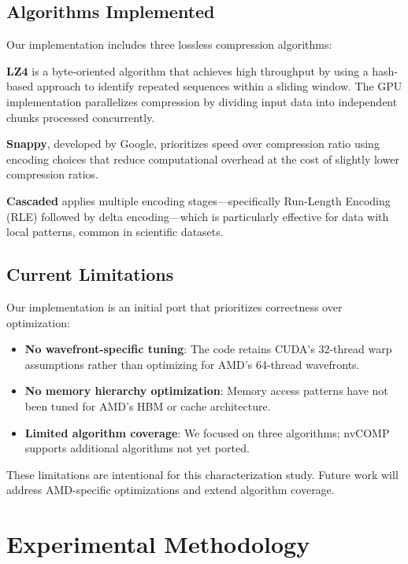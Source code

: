 \documentclass[runningheads]{llncs}
\begin{document}
\subsection{Algorithms Implemented}

Our implementation includes three lossless compression algorithms:

\textbf{LZ4} is a byte-oriented algorithm that achieves high throughput by using a hash-based approach to identify repeated sequences within a sliding window. The GPU implementation parallelizes compression by dividing input data into independent chunks processed concurrently.

\textbf{Snappy}, developed by Google, prioritizes speed over compression ratio using encoding choices that reduce computational overhead at the cost of slightly lower compression ratios.

\textbf{Cascaded} applies multiple encoding stages---specifically Run-Length Encoding (RLE) followed by delta encoding---which is particularly effective for data with local patterns, common in scientific datasets.

\subsection{Current Limitations}

Our implementation is an initial port that prioritizes correctness over optimization:

\begin{itemize}
    \item \textbf{No wavefront-specific tuning}: The code retains CUDA's 32-thread warp assumptions rather than optimizing for AMD's 64-thread wavefronts.
    \item \textbf{No memory hierarchy optimization}: Memory access patterns have not been tuned for AMD's HBM or cache architecture.
    \item \textbf{Limited algorithm coverage}: We focused on three algorithms; nvCOMP supports additional algorithms not yet ported.
\end{itemize}

These limitations are intentional for this characterization study. Future work will address AMD-specific optimizations and extend algorithm coverage.



%


\section{Experimental Methodology}
\label{sec:methodology}
\end{document}
